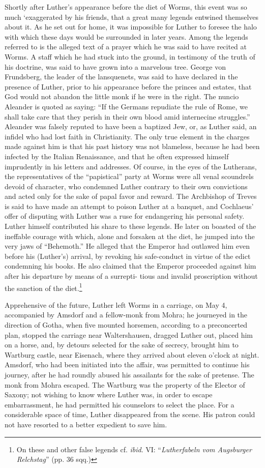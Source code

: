 Shortly after Luther’s appearance before the diet of Worms, this
event was so much ‘exaggerated by his friends, that a great many
legends entwined themselves about it. As he set out for home, it
was impossible for Luther to foresee the halo with which these days
would be surrounded in later years. Among the legends referred to is
the alleged text of a prayer which he was said to have recited at
Worms. A staff which he had stuck into the ground, in testimony of
the truth of his doctrine, was said to have grown into a marvelous tree.
George von Frundsberg, the leader of the lansquenets, was
said to have declared in the presence of Luther, prior to his appearance
before the princes and estates, that God would not abandon
the little monk if he were in the right. The nuncio Aleander is
quoted as saying: “If the Germans repudiate the rule of Rome,
we shall take care that they perish in their own blood amid internecine
struggles.” Aleander was falsely reputed to have been a baptized
Jew, or, as Luther said, an infidel who had lost faith in Christianity.
The only true element in the charges made against him is that his
past history was not blameless, because he had been infected by
the Italian Renaissance, and that he often expressed himself imprudently
in his letters and addresses. Of course, in the eyes of the
Lutherans, the representatives of the “papistical” party at Worms
were all venal scoundrels devoid of character, who condemned
Luther contrary to their own convictions and acted only for the
sake of papal favor and reward. The Archbishop of Treves is
said to have made an attempt to poison Luther at a banquet, and
Cochlaeus’ offer of disputing with Luther was a ruse for endangering his
personal safety. Luther himself contributed his share to these
legends. He later on boasted of the ineffable courage with which,
alone and forsaken at the diet, he jumped into the very jaws of
“Behemoth.” He alleged that the Emperor had outlawed him even
before his (Luther’s) arrival, by revoking his safe-conduct in virtue
of the edict condemning his books. He also claimed that the Emperor
proceeded against him after his departure by means of a surrepti-
tious and invalid proscription without the sanction of the diet.\footnote
{On these and other false legends cf. \textit{ibid}. VI: “\textit{Lutherfabeln vom Augsburger
Relchstag}” (pp. 36 sqq.)}

Apprehensive of the future, Luther left Worms in a carriage, on
May 4, accompanied by Amsdorf and a fellow-monk from Mohra;
he journeyed in the direction of Gotha, when five mounted horsemen, according
to a preconcerted plan, stopped the carriage near
Waltershausen, dragged Luther out, placed him on a horse, and, by
detours selected for the sake of secrecy, brought him to Wartburg
castle, near Eisenach, where they arrived about eleven o’clock at
night. Amsdorf, who had been initiated into the affair, was permitted
to continue his journey, after he had roundly abused his
assailants for the sake of pretense. The monk from Mohra escaped.
The Wartburg was the property of the Elector of Saxony; not
wishing to know where Luther was, in order to escape embarrassment,
he had permitted his counselors to select the place. For a considerable
space of time, Luther disappeared from the scene. His patron could
not have resorted to a better expedient to save him.
